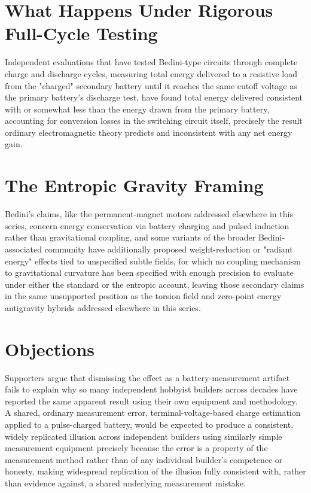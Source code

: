 \documentclass[11pt]{article}
\begin{document}
\section{What Happens Under Rigorous Full-Cycle Testing}

Independent evaluations that have tested Bedini-type circuits through complete charge and discharge cycles, measuring total energy delivered to a resistive load from the "charged" secondary battery until it reaches the same cutoff voltage as the primary battery's discharge test, have found total energy delivered consistent with or somewhat less than the energy drawn from the primary battery, accounting for conversion losses in the switching circuit itself, precisely the result ordinary electromagnetic theory predicts and inconsistent with any net energy gain.

\section{The Entropic Gravity Framing}

Bedini's claims, like the permanent-magnet motors addressed elsewhere in this series, concern energy conservation via battery charging and pulsed induction rather than gravitational coupling, and some variants of the broader Bedini-associated community have additionally proposed weight-reduction or "radiant energy" effects tied to unspecified subtle fields, for which no coupling mechanism to gravitational curvature has been specified with enough precision to evaluate under either the standard or the entropic account, leaving those secondary claims in the same unsupported position as the torsion field and zero-point energy antigravity hybrids addressed elsewhere in this series.

\section{Objections}

Supporters argue that dismissing the effect as a battery-measurement artifact fails to explain why so many independent hobbyist builders across decades have reported the same apparent result using their own equipment and methodology. A shared, ordinary measurement error, terminal-voltage-based charge estimation applied to a pulse-charged battery, would be expected to produce a consistent, widely replicated illusion across independent builders using similarly simple measurement equipment precisely because the error is a property of the measurement method rather than of any individual builder's competence or honesty, making widespread replication of the illusion fully consistent with, rather than evidence against, a shared underlying measurement mistake.
\end{document}
